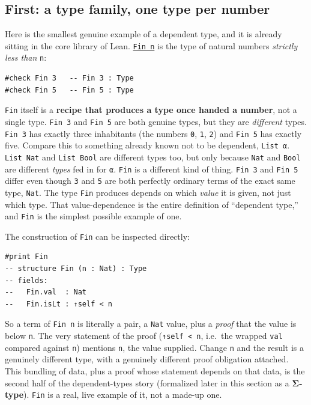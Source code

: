\subsection{First: a type family, one type per number}\label{sec:01-basics:03-dependent-types:3}

Here is the smallest genuine example of a dependent type, and it is already sitting in the core library of Lean. \href{https://leanprover-community.github.io/mathlib4_docs/Init/Prelude.html\#Fin}{\texttt{Fin n}} is the type of natural numbers \emph{strictly less than} \texttt{n}:

\begin{lstlisting}
#check Fin 3   -- Fin 3 : Type
#check Fin 5   -- Fin 5 : Type
\end{lstlisting}

\texttt{Fin} itself is a \textbf{recipe that produces a type once handed a number}, not a single type. \texttt{Fin 3} and \texttt{Fin 5} are both genuine types, but they are \emph{different} types. \texttt{Fin 3} has exactly three inhabitants (the numbers \texttt{0}, \texttt{1}, \texttt{2}) and \texttt{Fin 5} has exactly five. Compare this to something already known not to be dependent, \texttt{List α}. \texttt{List Nat} and \texttt{List Bool} are different types too, but only because \texttt{Nat} and \texttt{Bool} are different \emph{types} fed in for \texttt{α}. \texttt{Fin} is a different kind of thing. \texttt{Fin 3} and \texttt{Fin 5} differ even though \texttt{3} and \texttt{5} are both perfectly ordinary terms of the exact same type, \texttt{Nat}. The type \texttt{Fin} produces depends on which \emph{value} it is given, not just which type. That value-dependence is the entire definition of ``dependent type,'' and \texttt{Fin} is the simplest possible example of one.

The construction of \texttt{Fin} can be inspected directly:

\begin{lstlisting}
#print Fin
-- structure Fin (n : Nat) : Type
-- fields:
--   Fin.val  : Nat
--   Fin.isLt : ↑self < n
\end{lstlisting}

So a term of \texttt{Fin n} is literally a pair, a \texttt{Nat} value, plus a \emph{proof} that the value is below \texttt{n}. The very statement of the proof (\texttt{↑self < n}, i.e.~the wrapped \texttt{val} compared against \texttt{n}) mentions \texttt{n}, the value supplied. Change \texttt{n} and the result is a genuinely different type, with a genuinely different proof obligation attached. This bundling of data, plus a proof whose statement depends on that data, is the second half of the dependent-types story (formalized later in this section as a \textbf{Σ-type}). \texttt{Fin} is a real, live example of it, not a made-up one.

